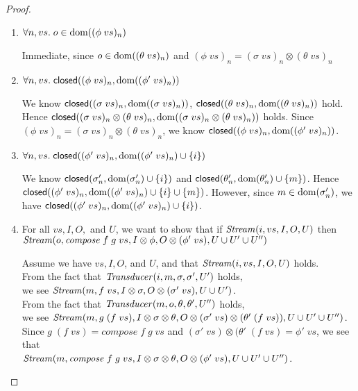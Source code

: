 \begin{proof}
\begin{enumerate}
\item $\forall n, vs.\; o \in \mbox{dom}({(\phi\;vs)_n})$ 

  Immediate, since $o \in \mbox{dom}({(\theta\;vs)_n})$ and $(\phi\;vs)_n = (\sigma\;vs)_n \otimes (\theta\;vs)_n$ \

\item $\forall n, vs.\; \mathsf{closed}({(\phi\;vs)_n}, {\mbox{dom}({(\phi'\;vs)_n})})$

  We know  $\mathsf{closed}({(\sigma\;vs)_n}, {\mbox{dom}({(\sigma\;vs)_n})})$,  
   $\mathsf{closed}({(\theta\;vs)_n}, {\mbox{dom}({(\theta\;vs)_n})})$ hold.
   Hence $\mathsf{closed}({(\sigma\;vs)_n \otimes (\theta\;vs)_n}, {\mbox{dom}({(\sigma\;vs)_n \otimes (\theta\;vs)_n})})$ holds. 
   Since $(\phi\;vs)_n = (\sigma\;vs)_n \otimes (\theta\;vs)_n$, 
 we know $\mathsf{closed}({(\phi\;vs)_n}, {\mbox{dom}({(\phi'\;vs)_n})})$. 


\item $\forall n, vs.\; \mathsf{closed}({(\phi'\;vs)_n}, {\mbox{dom}({(\phi'\;vs)_n}) \cup \{{i}\}})$ 

  We know $\mathsf{closed}({\sigma'_n}, {\mbox{dom}({\sigma'_n}) \cup \{{i}\}})$ and $\mathsf{closed}({\theta'_n}, {\mbox{dom}({\theta'_n}) \cup \{{m}\}})$. 
  Hence $\mathsf{closed}({(\phi'\;vs)_n}, {\mbox{dom}({(\phi'\;vs)_n}) \cup \{{i}\} \cup \{{m}\}})$. However, since $m \in \mbox{dom}({\sigma'_n})$, we 
  have $\mathsf{closed}({(\phi'\;vs)_n}, {\mbox{dom}({(\phi'\;vs)_n}) \cup \{{i}\}})$. 


  
\item For all $vs, I, O,$ and $U$, we want to show that if $\mathit{Stream}(i, vs, I, O, U)$ then $\mathit{Stream}(o, \mathit{compose}\;f\;g\;vs, I \otimes \phi, O \otimes (\phi'\;vs), U \cup U' \cup U'')$
  \begin{tabbedproof}
  \oo Assume we have $vs, I, O$, and $U$, and that $\mathit{Stream}(i, vs, I, O, U)$ holds. \\
  \oo From the fact that $\mathit{Transducer}(i, m, \sigma, \sigma', U')$ holds, \\
  \oo we see $\mathit{Stream}(m, f\;vs, I \otimes \sigma, O \otimes (\sigma'\;vs), U \cup U')$. \\
  \oo From the fact that $\mathit{Transducer}(m, o, \theta, \theta', U'')$ holds, \\
  \oo we see $\mathit{Stream}(m, g\;(f\;vs), I \otimes \sigma \otimes \theta, O \otimes (\sigma'\;vs) \otimes (\theta'\;(f\;vs)), U \cup U' \cup U'')$. \\
  \oo Since $g\;(f\;vs) = \mathit{compose}\;f\;g\;vs$ and $(\sigma'\;vs) \otimes (\theta'\;(f\;vs) = \phi'\;vs$, we see that \\
  \oo $\mathit{Stream}(m, \mathit{compose}\;f\;g\;vs, I \otimes \sigma \otimes \theta, O \otimes (\phi'\;vs), U \cup U' \cup U'')$.
  \end{tabbedproof}
\end{enumerate}
\end{proof}

